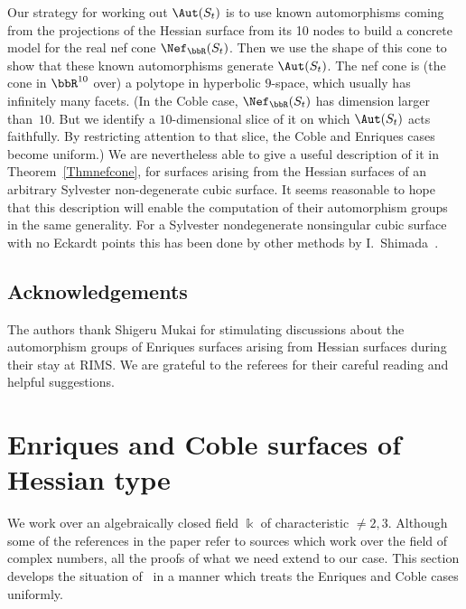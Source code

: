 Our strategy for working out $\Aut(S_t)$ is to use known automorphisms coming from the projections of the Hessian surface from its 10 nodes to build a concrete model for the real nef cone $\Nef_\bbR(S_t)$. Then we use the shape of this cone to show that these known automorphisms generate $\Aut(S_t)$. The nef cone is (the cone in $\bbR^{10}$ over) a polytope in hyperbolic $9$-space, which usually has infinitely many facets. (In the Coble case, $\Nef_\bbR(S_t)$ has dimension larger than~$10$. But we identify a $10$-dimensional slice of it on which $\Aut(S_t)$ acts faithfully. By restricting attention to that slice, the Coble and Enriques cases become uniform.) We are nevertheless able to give a useful description of it in Theorem~\ref{Thmnefcone}, for surfaces arising from the Hessian surfaces of an arbitrary Sylvester non-degenerate cubic surface. It seems reasonable to hope that this description will enable the computation of their automorphism groups in the same generality. For a Sylvester nondegenerate nonsingular cubic surface with no Eckardt points this has been done by other methods by I.~Shimada~\cite{Shimada}.



\subsection*{Acknowledgements}
The authors thank Shigeru Mukai for stimulating discussions about the automorphism groups of Enriques surfaces arising from Hessian surfaces during their stay at RIMS. We are grateful to the referees for their careful reading and helpful suggestions.


\section{Enriques and Coble surfaces of Hessian type}\label{SecBackground}

We work over an algebraically closed field $\Bbbk$ of characteristic $\ne 2,3$. Although some of the references in the paper refer to sources which work over the field of complex numbers, all the proofs of what we need extend to our case. This section develops the situation of~\cite{DolgachevSalem} in a manner which treats the Enriques and Coble cases uniformly.

